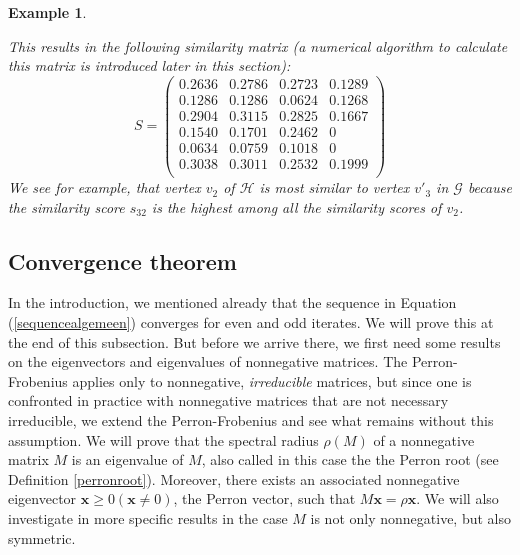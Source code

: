 \documentclass[a4paper,11pt]{report}
\newtheorem{example}[theorem]{Example}
\newcommand{\graf}{\mathscr{G}}
\newcommand{\grafeen}{\mathscr{H}}
\begin{document}
\begin{example}
\begin{center}
\end{center}
This results in the following similarity matrix (a numerical algorithm to calculate this matrix is introduced later
in this section):
$$S = \begin{pmatrix}
0.2636 & 0.2786 & 0.2723 & 0.1289 \\
0.1286 & 0.1286 & 0.0624 & 0.1268 \\
0.2904 & 0.3115 & 0.2825 & 0.1667 \\
0.1540 & 0.1701 & 0.2462 & 0 \\
0.0634 & 0.0759 & 0.1018 & 0 \\
0.3038 & 0.3011 & 0.2532 & 0.1999\\
 \end{pmatrix}$$
 We see for example, that vertex $v_2$ of $\grafeen$ is most similar to
 vertex $v'_3$ in $\graf$  because the similarity score $s_{32}$ 
 is the highest among all the similarity scores of $v_{2}$.
 \end{example}
 
 \subsection{Convergence theorem}
In the introduction, we mentioned already that the sequence in Equation (\ref{sequencealgemeen})
converges for even and odd iterates. We will prove this at the end of this subsection. But before we 
arrive there, we first need some results on the eigenvectors and eigenvalues of nonnegative matrices. 
The Perron-Frobenius applies only to nonnegative, \emph{irreducible} matrices, 
but  since one is confronted in practice 
with nonnegative matrices that are not necessary irreducible,  we extend the Perron-Frobenius and see what remains without this assumption. 
We will prove that the spectral radius $\rho(M)$ of a nonnegative matrix 
$M$ is an eigenvalue of $M$, also called in this case the the Perron root (see Definition \ref{perronroot}). Moreover, there exists an 
associated nonnegative eigenvector $\mathbf{x} \geq 0 (\mathbf{x} \not = 0)$, the Perron vector, such 
that $M\mathbf{x} = \rho\mathbf{x}$.  We will also investigate in more specific 
results in the case $M$ is not only nonnegative, but also symmetric. 
\end{document}
